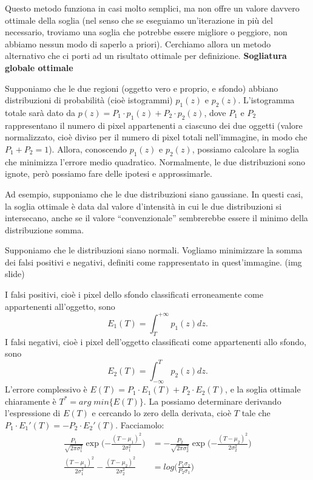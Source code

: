 \documentclass[a4paper,11pt]{article}
\begin{document}
Questo metodo funziona in casi molto semplici, ma non offre un valore davvero ottimale della soglia (nel senso che se eseguiamo un'iterazione in più
del necessario, troviamo una soglia che potrebbe essere migliore o peggiore, non abbiamo nessun modo di saperlo a priori). Cerchiamo allora un
metodo alternativo che ci porti ad un risultato ottimale per definizione.
\newline
\newline
\textbf{Sogliatura globale ottimale}
\par
Supponiamo che le due regioni (oggetto vero e proprio, e sfondo) abbiano distribuzioni di probabilità (cioè istogrammi) $p_1(z)$ e $p_2(z)$.
L'istogramma totale sarà dato da $p(z)=P_1 \cdot p_1(z) + P_2 \cdot p_2(z)$, dove $P_1$ e $P_2$ rappresentano il numero di pixel appartenenti a
ciascuno dei due oggetti (valore normalizzato, cioè diviso per il numero di pixel totali nell'immagine, in modo che $P_1 + P_2 = 1$).
Allora, conoscendo $p_1(z)$ e $p_2(z)$, possiamo calcolare la soglia che minimizza l'errore medio quadratico. Normalmente, le due distribuzioni
sono ignote, però possiamo fare delle ipotesi e approssimarle.
\par
Ad esempio, supponiamo che le due distribuzioni siano gaussiane. In questi casi, la soglia ottimale è data dal valore d'intensità in cui le due
distribuzioni si intersecano, anche se il valore ``convenzionale'' sembrerebbe essere il minimo della distribuzione somma.
\par
Supponiamo che le distribuzioni siano normali. Vogliamo minimizzare la somma dei falsi positivi e negativi, definiti come rappresentato in quest'immagine.
(img slide)
\par
I falsi positivi, cioè i pixel dello sfondo classificati erroneamente come appartenenti all'oggetto, sono
\[
E_1(T) = \int_{T}^{+\infty} p_1(z)dz.
\]
I falsi negativi, cioè i pixel dell'oggetto classificati come appartenenti allo sfondo, sono
\[
E_2(T) = \int_{-\infty}^{T} p_2(z)dz.
\]
L'errore complessivo è $E(T) = P_1 \cdot E_1(T) + P_2 \cdot E_2(T)$, e la soglia ottimale chiaramente è $T^* = arg \; min\{E(T)\}$. La possiamo
determinare derivando l'espressione di $E(T)$ e cercando lo zero della derivata, cioè $T$ tale che $P_1 \cdot E_1'(T) = - P_2 \cdot E_2'(T)$.
Facciamolo:
\begin{align*}
    \frac{P_1}{\sqrt{2\pi \sigma_1^2}} \exp\Bigg({-\frac{(T-\mu_1)^2}{2\sigma_1^2}}\Bigg) &= -
    \frac{P_2}{\sqrt{2\pi \sigma_2^2}} \exp\Bigg({-\frac{(T-\mu_2)^2}{2\sigma_2^2}}\Bigg) \\
    \frac{(T-\mu_1)^2}{2\sigma_1^2} - \frac{(T-\mu_2)^2}{2\sigma_2^2} &= log\Bigg(\frac{P_1 \sigma_2}{P_2 \sigma_1}\Bigg)
\end{align*}
\end{document}
